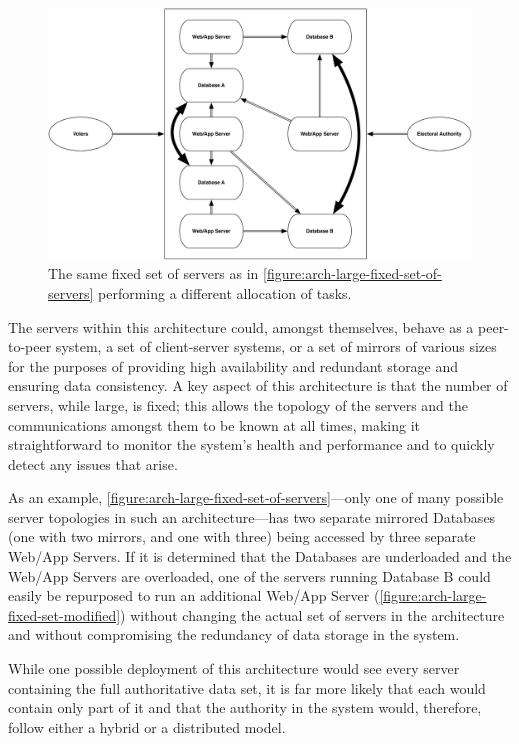 \begin{figure}
\begin{center}
\includegraphics[width=6.5in]{architecture_resources/large-fixed-set-modified.pdf}
\end{center}
\caption{The same fixed set of servers as in
  \autoref{figure:arch-large-fixed-set-of-servers} performing a different
  allocation of tasks.}
\label{figure:arch-large-fixed-set-modified}
\end{figure}

The servers within this architecture could, amongst themselves, behave
as a peer-to-peer system, a set of client-server systems, or a set of
mirrors of various sizes for the purposes of providing high
availability and redundant storage and ensuring data consistency. A
key aspect of this architecture is that the number of servers, while
large, is fixed; this allows the topology of the servers and the
communications amongst them to be known at all times, making it
straightforward to monitor the system's health and performance and to
quickly detect any issues that arise.

As an example, \autoref{figure:arch-large-fixed-set-of-servers}---only
one of many possible server topologies in such an architecture---has
two separate mirrored Databases (one with two mirrors, and one with
three) being accessed by three separate Web/App Servers. If it is
determined that the Databases are underloaded and the Web/App Servers
are overloaded, one of the servers running Database B could easily be
repurposed to run an additional Web/App Server
(\autoref{figure:arch-large-fixed-set-modified}) without changing the
actual set of servers in the architecture and without compromising the
redundancy of data storage in the system.

While one possible deployment of this architecture would see every
server containing the full authoritative data set, it is far more
likely that each would contain only part of it and that the authority
in the system would, therefore, follow either a hybrid or a distributed
model. 

